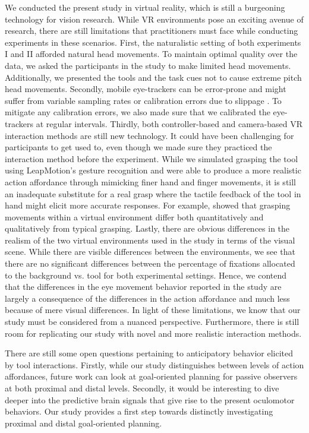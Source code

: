 We conducted the present study in virtual reality, which is still a burgeoning technology for vision research. While VR environments pose an exciting avenue of research, there are still limitations that practitioners must face while conducting experiments in these scenarios. First, the naturalistic setting of both experiments I and II afforded natural head movements. To maintain optimal quality over the data, we asked the participants in the study to make limited head movements. Additionally, we presented the tools and the task cues not to cause extreme pitch head movements. Secondly, mobile eye-trackers can be error-prone and might suffer from variable sampling rates \citep{Ehinger2019-xr} or calibration errors due to slippage \citep{Niehorster2020-yq}. To mitigate any calibration errors, we also made sure that we calibrated the eye-trackers at regular intervals. Thirdly, both controller-based and camera-based VR interaction methods are still new technology. It could have been challenging for participants to get used to, even though we made sure they practiced the interaction method before the experiment. While we simulated grasping the tool using LeapMotion’s gesture recognition and were able to produce a more realistic action affordance through mimicking finer hand and finger movements, it is still an inadequate substitute for a real grasp where the tactile feedback of the tool in hand might elicit more accurate responses. For example,\citet{Ozana2018-ih} showed that grasping movements within a virtual environment differ both quantitatively and qualitatively from typical grasping. Lastly, there are obvious differences in the realism of the two virtual environments used in the study in terms of the visual scene. While there are visible differences between the environments, we see that there are no significant differences between the percentage of fixations allocated to the background vs. tool for both experimental settings. Hence, we contend that the differences in the eye movement behavior reported in the study are largely a consequence of the differences in the action affordance and much less because of mere visual differences. In light of these limitations, we know that our study must be considered from a nuanced perspective. Furthermore, there is still room for replicating our study with novel and more realistic interaction methods.

There are still some open questions pertaining to anticipatory behavior elicited by tool interactions. Firstly, while our study distinguishes between levels of action affordances, future work can look at goal-oriented planning for passive observers at both proximal and distal levels. Secondly, it would be interesting to dive deeper into the predictive brain signals that give rise to the present oculomotor behaviors. Our study provides a first step towards distinctly investigating proximal and distal goal-oriented planning.

